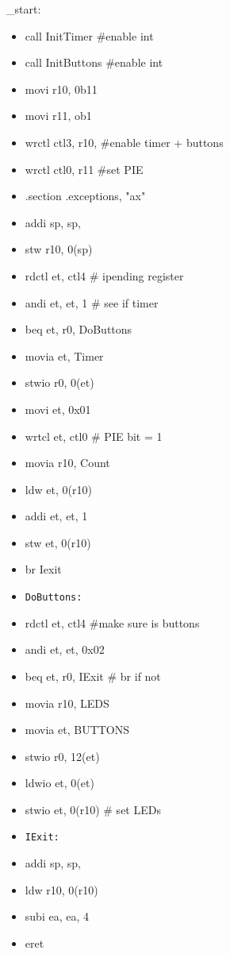 \documentclass[11pt]{article}
\begin{document}
\_start:
\begin{itemize}
\item call InitTimer \#enable int
\item call InitButtons \#enable int
\item movi r10, 0b11
\item movi r11, ob1
\item wrctl ctl3, r10, \#enable timer + buttons
\item wrctl ctl0, r11 \#set PIE
\item .section .exceptions, "ax"
\item addi sp, sp,
\item stw r10, 0(sp)

\item rdctl et, ctl4 \# ipending register
\item andi et, et, 1 \# see if timer
\item beq et, r0, DoButtons

\item movia et, Timer
\item stwio r0, 0(et)

\item movi et, 0x01
\item wrtcl et, ctl0 \# PIE bit = 1

\item movia r10, Count
\item ldw et, 0(r10)
\item addi et, et, 1
\item stw et, 0(r10)
\item br Iexit

\item \texttt{DoButtons:}
\item rdctl et, ctl4 \#make sure is buttons
\item andi et, et, 0x02
\item beq et, r0, IExit \# br if not
\item movia r10, LEDS
\item movia et, BUTTONS
\item stwio r0, 12(et)
\item ldwio et, 0(et)
\item stwio et, 0(r10) \# set LEDs

\item \texttt{IExit:}
\item addi sp, sp,
\item ldw r10, 0(r10)
\item subi ea, ea, 4
\item eret
\end{itemize}
\end{document}
